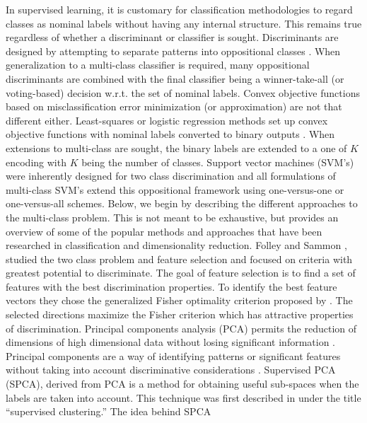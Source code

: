 In supervised learning, it is customary for classification methodologies
to regard classes as nominal labels without having any internal structure.
This remains true regardless of whether a discriminant or classifier
is sought. Discriminants are designed by attempting to separate patterns
into oppositional classes \citep{Bishop1996,DudaHart1973,hastie1996discriminant}.
When generalization to a multi-class classifier is required, many
oppositional discriminants are combined with the final classifier
being a winner-take-all (or voting-based) decision w.r.t. the set
of nominal labels. Convex objective functions based on misclassification
error minimization (or approximation) are not that different either.
Least-squares or logistic regression methods set up convex objective
functions with nominal labels converted to binary outputs \citep{Ye2007,bishop2006pattern}.
When extensions to multi-class are sought, the binary labels are extended
to a one of $K$ encoding with $K$ being the number of classes. Support
vector machines (SVM's) were inherently designed for two class discrimination
and all formulations of multi-class SVM's extend this oppositional
framework using one-versus-one or one-versus-all schemes. Below, we
begin by describing the different approaches to the multi-class problem.
This is not meant to be exhaustive, but provides an overview of some
of the popular methods and approaches that have been researched in
classification and dimensionality reduction. Folley and Sammon \citep{Sammon1970},
\citep{FoleySammon1975} studied the two class problem and feature
selection and focused on criteria with greatest potential to discriminate.
The goal of feature selection is to find a set of features with the
best discrimination properties. To identify the best feature vectors
they chose the generalized Fisher optimality criterion proposed by
\citep{AndersonBahadur1962}. The selected directions maximize the
Fisher criterion which has attractive properties of discrimination.
Principal components analysis (PCA) permits the reduction of dimensions
of high dimensional data without losing significant information \citep{Hotelling1933,Jolliffe1986,scholkopf1999advances}.
Principal components are a way of identifying patterns or significant
features without taking into account discriminative considerations
\citep{rao1964use}. Supervised PCA (SPCA), derived from PCA is a
method for obtaining useful sub-spaces when the labels are taken into
account. This technique was first described in \citep{bair2004semi}
under the title ``supervised clustering.'' The idea behind SPCA
